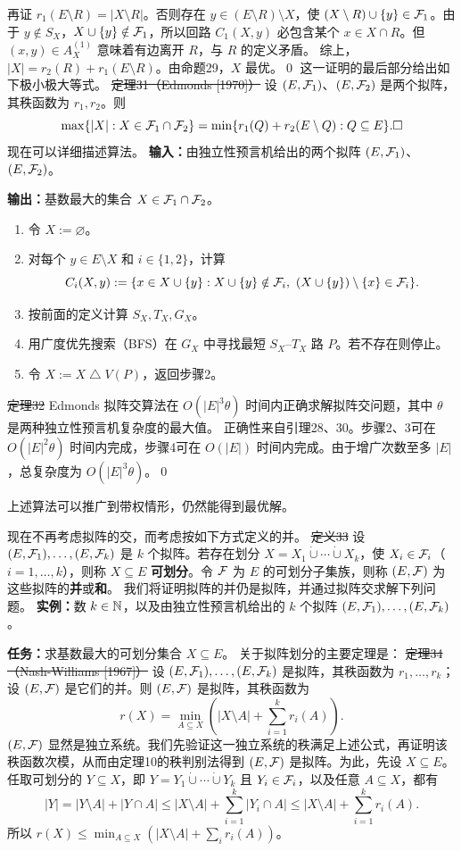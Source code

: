 再证 $r_1(E\setminus R)=|X\setminus R|$。否则存在 $y\in(E\setminus R)\setminus X$，使 $(X\setminus R)\cup\{y\}\in\mathcal F_1$。由于 $y\notin S_X$，$X\cup\{y\}\notin\mathcal F_1$，所以回路 $C_1(X,y)$ 必包含某个 $x\in X\cap R$。但 $(x,y)\in A_X^{(1)}$ 意味着有边离开 $R$，与 $R$ 的定义矛盾。
综上，$|X|=r_2(R)+r_1(E\setminus R)$。由命题29，$X$ 最优。\qed
这一证明的最后部分给出如下极小极大等式。
\st{定理31（Edmonds [1970]）} 设 $(E,\mathcal F_1)$、$(E,\mathcal F_2)$ 是两个拟阵，其秩函数为 $r_1,r_2$。则
\[\max\{|X|:X\in\mathcal F_1\cap\mathcal F_2\}=\min\{r_1(Q)+r_2(E\setminus Q):Q\subseteq E\}.\square\]
现在可以详细描述算法。
\textbf{输入：}由独立性预言机给出的两个拟阵 $(E,\mathcal F_1)$、$(E,\mathcal F_2)$。\par
\textbf{输出：}基数最大的集合 $X\in\mathcal F_1\cap\mathcal F_2$。
\begin{enumerate}[label=\arabic*.]
\item 令 $X:=\varnothing$。
\item 对每个 $y\in E\setminus X$ 和 $i\in\{1,2\}$，计算
\[C_i(X,y):=\{x\in X\cup\{y\}:X\cup\{y\}\notin\F_i,\ (X\cup\{y\})\setminus\{x\}\in\F_i\}.\]
\item 按前面的定义计算 $S_X,T_X,G_X$。
\item 用广度优先搜索（BFS）在 $G_X$ 中寻找最短 $S_X$--$T_X$ 路 $P$。若不存在则停止。
\item 令 $X:=X\mathbin{\triangle}V(P)$，返回步骤2。
\end{enumerate}
\st{定理32} Edmonds 拟阵交算法在 $O(|E|^3\theta)$ 时间内正确求解拟阵交问题，其中 $\theta$ 是两种独立性预言机复杂度的最大值。
\pr 正确性来自引理28、30。步骤2、3可在 $O(|E|^2\theta)$ 时间内完成，步骤4可在 $O(|E|)$ 时间内完成。由于增广次数至多 $|E|$，总复杂度为 $O(|E|^3\theta)$。\qed

上述算法可以推广到带权情形，仍然能得到最优解。

现在不再考虑拟阵的交，而考虑按如下方式定义的并。
\st{定义33} 设 $(E,\mathcal F_1),\ldots,(E,\mathcal F_k)$ 是 $k$ 个拟阵。若存在划分 $X=X_1\mathbin{\dot\cup}\cdots\mathbin{\dot\cup}X_k$，使 $X_i\in\mathcal F_i$（$i=1,\ldots,k$），则称 $X\subseteq E$ \textbf{可划分}。令 $\mathcal F$ 为 $E$ 的可划分子集族，则称 $(E,\mathcal F)$ 为这些拟阵的\textbf{并}或\textbf{和}。
我们将证明拟阵的并仍是拟阵，并通过拟阵交求解下列问题。
\textbf{实例：}数 $k\in\mathbb N$，以及由独立性预言机给出的 $k$ 个拟阵 $(E,\mathcal F_1),\ldots,(E,\mathcal F_k)$。\par
\textbf{任务：}求基数最大的可划分集合 $X\subseteq E$。
关于拟阵划分的主要定理是：
\st{定理34（Nash-Williams [1967]）} 设 $(E,\mathcal F_1),\ldots,(E,\mathcal F_k)$ 是拟阵，其秩函数为 $r_1,\ldots,r_k$；设 $(E,\mathcal F)$ 是它们的并。则 $(E,\mathcal F)$ 是拟阵，其秩函数为
\[r(X)=\min_{A\subseteq X}\left(|X\setminus A|+\sum_{i=1}^kr_i(A)\right).\]
\pr $(E,\mathcal F)$ 显然是独立系统。我们先验证这一独立系统的秩满足上述公式，再证明该秩函数次模，从而由定理10的秩判别法得到 $(E,\mathcal F)$ 是拟阵。为此，先设 $X\subseteq E$。任取可划分的 $Y\subseteq X$，即 $Y=Y_1\mathbin{\dot\cup}\cdots\mathbin{\dot\cup}Y_k$ 且 $Y_i\in\mathcal F_i$，以及任意 $A\subseteq X$，都有
\[|Y|=|Y\setminus A|+|Y\cap A|\le|X\setminus A|+\sum_{i=1}^k|Y_i\cap A|
\le|X\setminus A|+\sum_{i=1}^kr_i(A).\]
所以 $r(X)\le\min_{A\subseteq X}(|X\setminus A|+\sum_i r_i(A))$。

